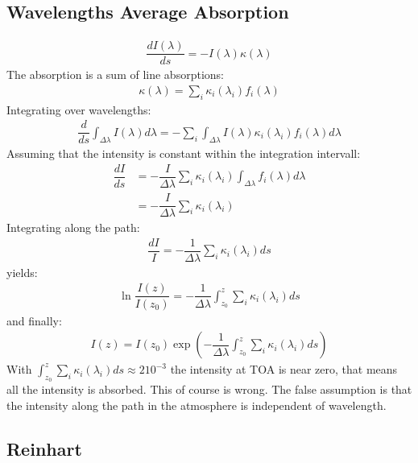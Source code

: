 \subsection{Wavelengths Average Absorption}

\begin{align}
	\dfrac{d I(\lambda)}{ds} = - I(\lambda) \kappa(\lambda)
\end{align}
The absorption is a sum of line absorptions:
\begin{align}
	\kappa(\lambda) = \sum_i \kappa_i(\lambda_i) f_i(\lambda)
\end{align}
Integrating over wavelengths:
\begin{align}
	\dfrac{d}{ds} \int_{\Delta \lambda} I(\lambda) d \lambda = - \sum_i  \int_{\Delta \lambda} I(\lambda) \kappa_i(\lambda_i) f_i(\lambda)  d \lambda
\end{align}
Assuming that the intensity is constant within the integration intervall:
\begin{align}
    \dfrac{d I}{ds} &= - \dfrac{I}{\Delta \lambda} \sum_i \kappa_i(\lambda_i)  \int_{\Delta \lambda}  f_i(\lambda)  d \lambda \\
                    &= - \dfrac{I}{\Delta \lambda} \sum_i \kappa_i(\lambda_i)
\end{align}
Integrating along the path:
\begin{align}
	\dfrac{dI}{I} = - \dfrac{1}{\Delta \lambda} \sum_i \kappa_i(\lambda_i) ds
\end{align}
yields:
\begin{align}
	\ln \dfrac{I(z)}{I(z_0)} = - \dfrac{1}{\Delta \lambda} \int_{z_0}^{z} \sum_i \kappa_i(\lambda_i) ds
\end{align}
and finally:
\begin{align}
	I(z) = I(z_0) \exp\left( - \dfrac{1}{\Delta \lambda} \int_{z_0}^{z} \sum_i \kappa_i(\lambda_i) ds \right)
\end{align}
With $\int_{z_0}^{z} \sum_i \kappa_i(\lambda_i) ds \approx 2 10^{-3}$ the intensity at TOA is near zero, that means all the intensity is absorbed.
This of course is wrong. The false assumption is that the intensity along the path in the atmosphere is independent of wavelength.

\subsection{Reinhart}

